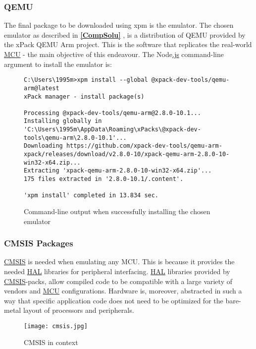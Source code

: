 \subsubsection{QEMU}
\label{qemu}
The final package to be downloaded using xpm is the emulator. The chosen emulator as described in \textbf{\ref{CompSolu} }, is a distribution of QEMU provided by the xPack QEMU Arm project. This is the software that replicates the real-world \hyperref[listAbr]{MCU} - the main objective of this endeavour. The Node\hyperref[listExt]{.js} command-line argument to install the emulator is:
\begin{figure}[H]
\begin{center}
\begin{lstlisting}[style=DOS]
C:\Users\1995m>xpm install --global @xpack-dev-tools/qemu-arm@latest
xPack manager - install package(s)

Processing @xpack-dev-tools/qemu-arm@2.8.0-10.1...
Installing globally in 'C:\Users\1995m\AppData\Roaming\xPacks\@xpack-dev-tools\qemu-arm\2.8.0-10.1'...
Downloading https://github.com/xpack-dev-tools/qemu-arm-xpack/releases/download/v2.8.0-10/xpack-qemu-arm-2.8.0-10-win32-x64.zip...
Extracting 'xpack-qemu-arm-2.8.0-10-win32-x64.zip'...
175 files extracted in '2.8.0-10.1/.content'.

'xpm install' completed in 13.834 sec.
\end{lstlisting}
\caption{Command-line output when successfully installing the chosen emulator}
\label{fig:cmd5}
\end{center}
\end{figure}

\subsubsection{CMSIS Packages}
\label{qemu}
\hyperref[listAbr]{CMSIS} is needed when emulating any MCU. This is because it provides the needed \hyperref[listAbr]{HAL} libraries for peripheral interfacing. \hyperref[listAbr]{HAL} libraries provided by \hyperref[listAbr]{CMSIS}-packs, allow compiled code to be compatible with a large variety of vendors and \hyperref[listAbr]{MCU} configurations. Hardware is, moreover, abstracted in such a way that specific application code does not need to be optimized for the bare-metal layout of processors and peripherals. 

\begin{figure}[H]
\begin{center}
\texttt{[image: cmsis.jpg]}
\caption{CMSIS in context}
\label{fig:cmsis.jpg}
\end{center}
\end{figure}

